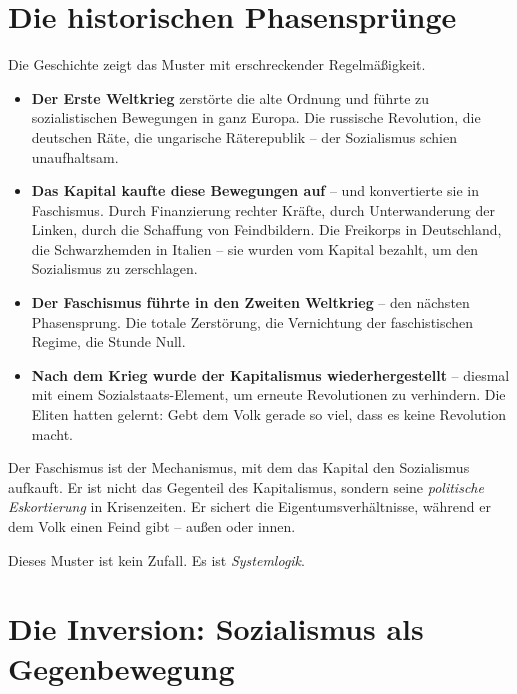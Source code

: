 \documentclass[12pt,a4paper]{book}
\begin{document}
\chapter{Die historischen Phasensprünge}

Die Geschichte zeigt das Muster mit erschreckender Regelmäßigkeit.

\begin{itemize}
    \item \textbf{Der Erste Weltkrieg} zerstörte die alte Ordnung und führte zu sozialistischen Bewegungen in ganz Europa. Die russische Revolution, die deutschen Räte, die ungarische Räterepublik – der Sozialismus schien unaufhaltsam.
    \item \textbf{Das Kapital kaufte diese Bewegungen auf} – und konvertierte sie in Faschismus. Durch Finanzierung rechter Kräfte, durch Unterwanderung der Linken, durch die Schaffung von Feindbildern. Die Freikorps in Deutschland, die Schwarzhemden in Italien – sie wurden vom Kapital bezahlt, um den Sozialismus zu zerschlagen.
    \item \textbf{Der Faschismus führte in den Zweiten Weltkrieg} – den nächsten Phasensprung. Die totale Zerstörung, die Vernichtung der faschistischen Regime, die Stunde Null.
    \item \textbf{Nach dem Krieg wurde der Kapitalismus wiederhergestellt} – diesmal mit einem Sozialstaats-Element, um erneute Revolutionen zu verhindern. Die Eliten hatten gelernt: Gebt dem Volk gerade so viel, dass es keine Revolution macht.
\end{itemize}

Der Faschismus ist der Mechanismus, mit dem das Kapital den Sozialismus aufkauft. Er ist nicht das Gegenteil des Kapitalismus, sondern seine \emph{politische Eskortierung} in Krisenzeiten. Er sichert die Eigentumsverhältnisse, während er dem Volk einen Feind gibt – außen oder innen.

Dieses Muster ist kein Zufall. Es ist \emph{Systemlogik}.

\chapter{Die Inversion: Sozialismus als Gegenbewegung}
\end{document}
